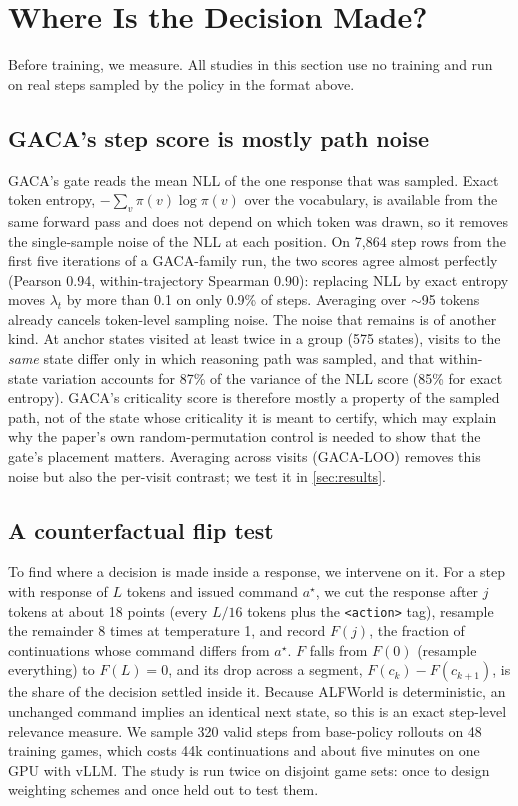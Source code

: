 \section{Where Is the Decision Made?}
\label{sec:measure}

Before training, we measure. All studies in this section use no training and run on real steps
sampled by the policy in the format above.

\subsection{GACA's step score is mostly path noise}
\label{sec:noise}
GACA's gate reads the mean NLL of the one response that was sampled. Exact token entropy,
$-\sum_v \pi(v)\log\pi(v)$ over the vocabulary, is available from the same forward pass and does not
depend on which token was drawn, so it removes the single-sample noise of the NLL at each position. On
7,864 step rows from the first five iterations of a GACA-family run, the two scores agree almost
perfectly (Pearson 0.94, within-trajectory Spearman 0.90): replacing NLL by exact entropy moves
$\lambda_t$ by more than 0.1 on only 0.9\% of steps. Averaging over $\sim$95 tokens already cancels
token-level sampling noise. The noise that remains is of another kind. At anchor states visited at
least twice in a group (575 states), visits to the \emph{same} state differ only in which reasoning
path was sampled, and that within-state variation accounts for 87\% of the variance of the NLL score
(85\% for exact entropy). GACA's criticality score is therefore mostly a property of the sampled path,
not of the state whose criticality it is meant to certify, which may explain why the paper's own
random-permutation control is needed to show that the gate's placement matters. Averaging across visits
(GACA-LOO) removes this noise but also the per-visit contrast; we test it in \cref{sec:results}.

\subsection{A counterfactual flip test}
To find where a decision is made inside a response, we intervene on it. For a step with response of
$L$ tokens and issued command $a^\star$, we cut the response after $j$ tokens at about 18 points
(every $L/16$ tokens plus the \texttt{<action>} tag), resample the remainder 8 times at temperature 1,
and record $F(j)$, the fraction of continuations whose command differs from $a^\star$. $F$ falls from
$F(0)$ (resample everything) to $F(L) = 0$, and its drop across a segment,
$F(c_k) - F(c_{k+1})$, is the share of the decision settled inside it. Because ALFWorld is
deterministic, an unchanged command implies an identical next state, so this is an exact step-level
relevance measure. We sample 320 valid steps from base-policy rollouts on 48 training games, which costs
44k continuations and about five minutes on one GPU with vLLM. The study is run twice on disjoint game
sets: once to design weighting schemes and once held out to test them.


